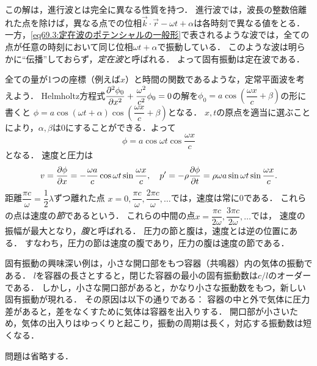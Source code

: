 この解は，進行波とは完全に異なる性質を持つ．
進行波では，波長の整数倍離れた点を除けば，異なる点での位相$\vec{k}\cdot\vec{r}-\omega t + \alpha$は各時刻で異なる値をとる．
一方，\eqref{eq69.3:定在波のポテンシャルの一般形}で表されるような波では，全ての点が任意の時刻において同じ位相$\omega t + \alpha$で振動している．
このような波は明らかに``伝播''しておらず，\emph{定在波}と呼ばれる．
よって固有振動は定在波である．


全ての量が1つの座標（例えば$x$）と時間の関数であるような，定常平面波を考えよう．
Helmholtz方程式$\dpdv[2]{\phi_0}{x} + \dfrac{\omega^2}{c^2}\phi_0=0$の解を$\phi_0 = a \cos\left( \dfrac{\omega x}{c} + \beta \right)$の形に書くと
$\phi = a \cos(\omega t + \alpha) \cos\left( \dfrac{\omega x}{c} + \beta \right)$となる．
$x,t$の原点を適当に選ぶことにより，$\alpha,\beta$は0にすることができる．よって
\begin{equation}
    \phi = a \cos \omega t \cos \frac{\omega x}{c}
\end{equation}
となる．
速度と圧力は
\[
    v = \pdv{\phi}{x} = -\frac{\omega a}{c} \cos \omega t \sin \frac{\omega x}{c}, \quad
    p' = -\rho \pdv{\phi}{t} = \rho\omega a \sin \omega t \sin \frac{\omega x}{c}.
\]
距離$\dfrac{\pi c}{\omega} = \dfrac{1}{2}\lambda$ずつ離れた点
$x = 0,  \dfrac{\pi c}{\omega}, \dfrac{2\pi c}{\omega}, \ldots$では，速度は常に0である．
これらの点は速度の\emph{節}であるという．
これらの中間の点$x = \dfrac{\pi c}{2\omega}, \dfrac{3\pi c}{2\omega}, \ldots$では，
速度の振幅が最大となり，\emph{腹}と呼ばれる．
圧力の節と腹は，速度とは逆の位置にある．
すなわち，圧力の節は速度の腹であり，圧力の腹は速度の節である．


固有振動の興味深い例は，小さな開口部をもつ容器（共鳴器）内の気体の振動である．
$l$を容器の長さとすると，閉じた容器の最小の固有振動数は$c/l$のオーダーである．
しかし，小さな開口部があると，かなり小さな振動数をもつ，新しい固有振動が現れる．
その原因は以下の通りである：
容器の中と外で気体に圧力差があると，差をなくすために気体は容器を出入りする．
開口部が小さいため，気体の出入りはゆっくりと起こり，振動の周期は長く，対応する振動数は短くなる．






問題は省略する．


\BackToTheToc